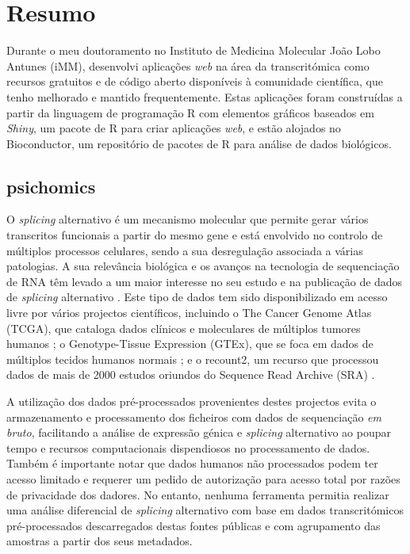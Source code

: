 \chapter*{Resumo}

Durante o meu doutoramento no Instituto de Medicina Molecular João Lobo Antunes (iMM), desenvolvi aplicações \emph{web} na área da transcritómica como recursos gratuitos e de código aberto disponíveis à comunidade científica, que tenho melhorado e mantido frequentemente. Estas aplicações foram construídas a partir da linguagem de programação R com elementos gráficos baseados em \emph{Shiny}, um pacote de R para criar aplicações \emph{web}, e estão alojados no Bioconductor, um repositório de pacotes de R para análise de dados biológicos.

\section*{psichomics}

O \emph{splicing} alternativo é um mecanismo molecular que permite gerar vários transcritos funcionais a partir do mesmo gene e está envolvido no controlo de múltiplos processos celulares, sendo a sua desregulação associada a várias patologias. A sua relevância biológica e os avanços na tecnologia de sequenciação de RNA têm levado a um maior interesse no seu estudo e na publicação de dados de \emph{splicing} alternativo \cite{wang:2008wa,tsai:2015ve,danan-gotthold:2015ut,chhibber:2017wm,climente-gonzalez:2017uj}. Este tipo de dados tem sido disponibilizado em acesso livre por vários projectos científicos, incluindo o The Cancer Genome Atlas (TCGA), que cataloga dados clínicos e moleculares de múltiplos tumores humanos \cite{chang:2013ww}; o Genotype-Tissue Expression (GTEx), que se foca em dados de múltiplos tecidos humanos normais \cite{lonsdale:2013uo}; e o recount2, um recurso que processou dados de mais de 2000 estudos oriundos do Sequence Read Archive (SRA) \cite{collado-torres:2017uw}.

A utilização dos dados pré-processados provenientes destes projectos evita o armazenamento e processamento dos ficheiros com dados de sequenciação \emph{em bruto}, facilitando a análise de expressão génica e \emph{splicing} alternativo ao poupar tempo e recursos computacionais dispendiosos no processamento de dados. Também é importante notar que dados humanos não processados podem ter acesso limitado e requerer um pedido de autorização para acesso total por razões de privacidade dos dadores. No entanto, nenhuma ferramenta permitia realizar uma análise diferencial de \emph{splicing} alternativo com base em dados transcritómicos pré-processados descarregados destas fontes públicas e com agrupamento das amostras a partir dos seus metadados.

